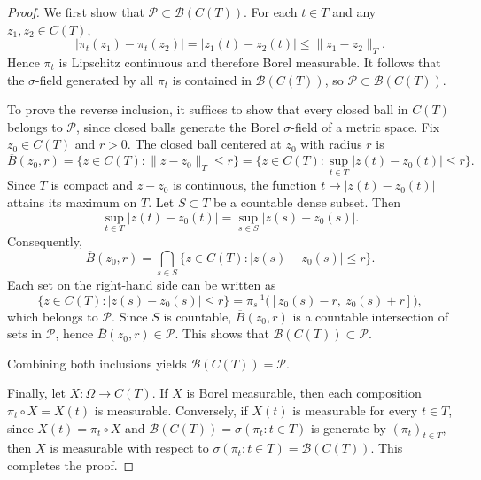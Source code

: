 \documentclass[12pt]{article}
\renewcommand{\(}{\left(}%
\renewcommand{\)}{\right)}%
\renewcommand{\[}{\left[}%
\renewcommand{\]}{\right]}%
\newtheorem{proof}{Proof.}}
\begin{document}
\begin{proof}
We first show that $\mathcal P \subset \mathcal B(C(T))$. For each $t\in T$ and any $z_1,z_2\in C(T)$,
\begin{equation*}
|\pi_t(z_1)-\pi_t(z_2)| = |z_1(t)-z_2(t)| \le \|z_1-z_2\|_T.
\end{equation*}
Hence $\pi_t$ is Lipschitz continuous and therefore Borel measurable. It follows that the $\sigma$-field generated by all $\pi_t$ is contained in $\mathcal B(C(T))$, so $\mathcal P \subset \mathcal B(C(T))$.

To prove the reverse inclusion, it suffices to show that every closed ball in $C(T)$ belongs to $\mathcal P$, since closed balls generate the Borel $\sigma$-field of a metric space. Fix $z_0\in C(T)$ and $r>0$. The closed ball centered at $z_0$ with radius $r$ is
\begin{equation*}
\overline B(z_0,r)
= \{z\in C(T): \|z-z_0\|_T \le r\}
= \Big\{z\in C(T): \sup_{t\in T}|z(t)-z_0(t)| \le r\Big\}.
\end{equation*}
Since $T$ is compact and $z-z_0$ is continuous, the function $t\mapsto |z(t)-z_0(t)|$ attains its maximum on $T$. Let $S\subset T$ be a countable dense subset. Then
\begin{equation*}
\sup_{t\in T}|z(t)-z_0(t)| = \sup_{s\in S}|z(s)-z_0(s)|.
\end{equation*}
Consequently,
\begin{equation*}
\overline B(z_0,r)
= \bigcap_{s\in S} \{z\in C(T): |z(s)-z_0(s)| \le r\}.
\end{equation*}
Each set on the right-hand side can be written as
\begin{equation*}
\{z\in C(T): |z(s)-z_0(s)| \le r\}
= \pi_s^{-1}\big([z_0(s)-r,\ z_0(s)+r]\big),
\end{equation*}
which belongs to $\mathcal P$. Since $S$ is countable, $\overline B(z_0,r)$ is a countable intersection of sets in $\mathcal P$, hence $\overline B(z_0,r)\in\mathcal P$. This shows that $\mathcal B(C(T))\subset \mathcal P$.

Combining both inclusions yields $\mathcal B(C(T))=\mathcal P$.

Finally, let $X:\Omega\to C(T)$. If $X$ is Borel measurable, then each composition $\pi_t\circ X = X(t)$ is measurable. Conversely, if $X(t)$ is measurable for every $t\in T$, since $X(t)=\pi_t\circ X$ and $\mathcal B(C(T))=\sigma(\pi_t:t\in T)$ is generate by $(\pi_t)_{t\in T}$, then $X$ is measurable with respect to $\sigma(\pi_t:t\in T)=\mathcal B(C(T))$. This completes the proof.
\end{proof}
\end{document}
